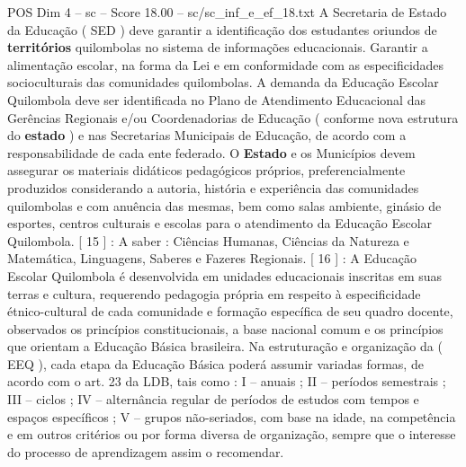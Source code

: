 \begin{textsample}{POS Dim 4 – sc – Score 18.00 – sc/sc\_inf\_e\_ef\_18.txt}
A Secretaria de Estado da Educação ( SED ) deve garantir a identificação dos estudantes oriundos de \textbf{territórios} quilombolas no sistema de informações educacionais.
Garantir a alimentação escolar, na forma da Lei e em conformidade com as especificidades socioculturais das comunidades quilombolas.
A demanda da Educação Escolar Quilombola deve ser identificada no Plano de Atendimento Educacional das Gerências Regionais e/ou Coordenadorias de Educação ( conforme nova estrutura do \textbf{estado} ) e nas Secretarias Municipais de Educação, de acordo com a responsabilidade de cada ente federado.
O \textbf{Estado} e os Municípios devem assegurar os materiais didáticos pedagógicos próprios, preferencialmente produzidos considerando a autoria, história e experiência das comunidades quilombolas e com anuência das mesmas, bem como salas ambiente, ginásio de esportes, centros culturais e escolas para o atendimento da Educação Escolar Quilombola. [ 15 ] : A saber : Ciências Humanas, Ciências da Natureza e Matemática, Linguagens, Saberes e Fazeres Regionais. [ 16 ] : A Educação Escolar Quilombola é desenvolvida em unidades educacionais inscritas em suas terras e cultura, requerendo pedagogia própria em respeito à especificidade étnico-cultural de cada comunidade e formação específica de seu quadro docente, observados os princípios constitucionais, a base nacional comum e os princípios que orientam a Educação Básica brasileira.
Na estruturação e organização da ( EEQ ), cada etapa da Educação Básica poderá assumir variadas formas, de acordo com o art. 23 da LDB, tais como : I – anuais ; II – períodos semestrais ; III – ciclos ; IV – alternância regular de períodos de estudos com tempos e espaços específicos ; V – grupos não-seriados, com base na idade, na competência e em outros critérios ou por forma diversa de organização, sempre que o interesse do processo de aprendizagem assim o recomendar.

\end{textsample}
